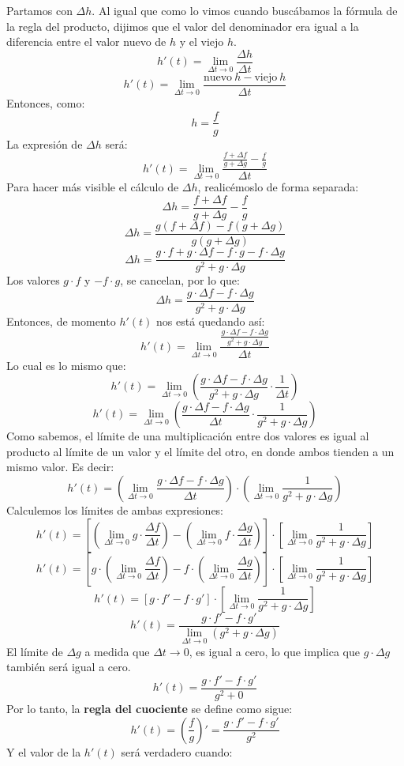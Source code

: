 \documentclass[12pt]{article}
\begin{document}
Partamos con $\Delta h$. Al igual que como lo vimos cuando buscábamos la fórmula de la regla del producto, dijimos que el valor del denominador era igual a la diferencia entre el valor nuevo de $h$ y el viejo $h$.
\[h'(t) = \lim_{\Delta t \to 0} \frac{\Delta h}{\Delta t}\]
\[h'(t) = \lim_{\Delta t \to 0} \frac{\mathrm{nuevo} \ h - \mathrm{viejo} \ h}{\Delta t}\]
Entonces, como:
\[h = \frac{f}{g}\]
La expresión de $\Delta h$ será:
\[h'(t) = \lim_{\Delta t \to 0} \frac{\frac{f + \Delta f}{g + \Delta g} - \frac{f}{g}}{\Delta t}\]
Para hacer más visible el cálculo de $\Delta h$, realicémoslo de forma separada:
\[\Delta h = \frac{f + \Delta f}{g + \Delta g} - \frac{f}{g}\]
\[\Delta h = \frac{g(f + \Delta f) - f(g + \Delta g)}{g(g + \Delta g)}\]
\[\Delta h = \frac{g \cdot f  + g \cdot \Delta f - f \cdot g - f \cdot \Delta g}{g^{2} + g \cdot \Delta g}\]
Los valores $g \cdot f$ y $- f \cdot g$, se cancelan, por lo que:
\[\Delta h = \frac{g \cdot \Delta f - f \cdot \Delta g}{g^{2} + g \cdot \Delta g}\]
Entonces, de momento $h'(t)$ nos está quedando así:
\[h'(t) = \lim_{\Delta t \to 0} \frac{\frac{g \cdot \Delta f - f \cdot \Delta g}{g^{2} + g \cdot \Delta g}}{\Delta t}\]
Lo cual es lo mismo que:
\[h'(t) = \lim_{\Delta t \to 0} \left(\frac{g \cdot \Delta f - f \cdot \Delta g}{g^{2} + g \cdot \Delta g} \cdot \frac{1}{\Delta t}\right)\]
\[h'(t) = \lim_{\Delta t \to 0} \left(\frac{g \cdot \Delta f - f \cdot \Delta g}{\Delta t} \cdot \frac{1}{g^{2} + g \cdot \Delta g}\right)\]
Como sabemos, el límite de una multiplicación entre dos valores es igual al producto al límite de un valor y el límite del otro, en donde ambos tienden a un mismo valor. Es decir:
\[h'(t) = \left(\lim_{\Delta t \to 0} \frac{g \cdot \Delta f - f \cdot \Delta g}{\Delta t}\right) \cdot \left(\lim_{\Delta t \to 0} \frac{1}{g^{2} + g \cdot \Delta g}\right)\]
Calculemos los límites de ambas expresiones:
\[h'(t) = \left[\left(\lim_{\Delta t \to 0} g \cdot \frac{\Delta f}{\Delta t}\right) - \left(\lim_{\Delta t \to 0} f \cdot \frac{\Delta g}{\Delta t}\right)\right] \cdot \left[\lim_{\Delta t \to 0} \frac{1}{g^{2} + g \cdot \Delta g}\right]\]
\[h'(t) = \left[g \cdot \left(\lim_{\Delta t \to 0} \frac{\Delta f}{\Delta t}\right) - f \cdot \left(\lim_{\Delta t \to 0} \frac{\Delta g}{\Delta t}\right)\right] \cdot \left[\lim_{\Delta t \to 0} \frac{1}{g^{2} + g \cdot \Delta g}\right]\]
\[h'(t) = [g \cdot f' - f \cdot g'] \cdot \left[\lim_{\Delta t \to 0} \frac{1}{g^{2} + g \cdot \Delta g}\right]\]
\[h'(t) = \frac{g \cdot f' - f \cdot g'}{\lim_{\Delta t \to 0} (g^{2} + g \cdot \Delta g)}\]
El límite de $\Delta g$ a medida que $\Delta t \to 0$, es igual a cero, lo que implica que $g \cdot \Delta g$ también será igual a cero.
\[h'(t) = \frac{g \cdot f' - f \cdot g'}{g^{2} + 0}\]
Por lo tanto, la \textbf{regla del cuociente} se define como sigue:
\[h'(t) = \left(\frac{f}{g}\right)' = \frac{g \cdot f' - f \cdot g'}{g^{2}}\]
Y el valor de la $h'(t)$ será verdadero cuando:
\end{document}
